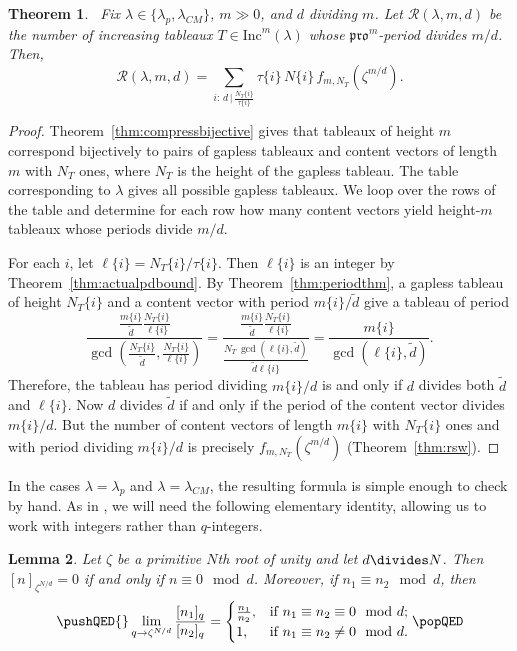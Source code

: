 \documentclass[12pt]{amsart}
\newtheorem{theorem}{Theorem}[section]
\newtheorem{lemma}[theorem]{Lemma}
\theoremstyle{definition}
\theoremstyle{remark}
\numberwithin{equation}{section}
\newcommand{\inc}{\ensuremath{\mathrm{Inc}}}
\newcommand{\pro}{\mathfrak{pro}}
\begin{document}
\begin{theorem}~\label{thm:mainresult}
Fix $\lambda \in \lbrace  \lambda_p, \lambda_{CM} \rbrace$, $m \gg 0$, and $d$ dividing $m$. Let $\mathcal{R}(\lambda,m,d)$ be the number of increasing tableaux $T \in \inc^m(\lambda)$ whose $\pro^m$-period divides $m/d$. Then,
\begin{equation}\label{eq:mainresulteq} 
\mathcal{R}(\lambda,m,d)  = \sum \limits_{i: \, d \, \vert \, \frac{N_T\{i\}}{\tau\{i\}}} \tau\{i\} \, N\{i\} \, f_{m,N_T}(\zeta^{m/d}).
\end{equation}
\end{theorem}
\begin{proof}
Theorem~\ref{thm:compressbijective} gives that tableaux of height $m$ correspond bijectively to pairs of gapless tableaux and content vectors of length $m$ with $N_T$ ones, where $N_T$ is the height of the gapless tableau. The table corresponding to $\lambda$ gives all possible gapless tableaux. We loop over the rows of the table and determine for each row how many content vectors yield height-$m$ tableaux whose periods divide $m/d$. 

For each $i$, let $\ell\{i\} = N_T\{i\}/\tau\{i\}$. Then $\ell\{i\}$ is an integer by Theorem~\ref{thm:actualpdbound}.  By Theorem~\ref{thm:periodthm}, a gapless tableau of height $N_T\{i\}$ and a content vector with period $m\{i\}/\tilde{d}$ give a tableau of period \[ \frac{\frac{m\{i\}}{\tilde{d}} \frac{N_T\{i\}}{\ell\{i\}}}{\gcd(\frac{N_T\{i\}}{\tilde{d}},\frac{N_T\{i\}}{\ell\{i\}})} = \frac{\frac{m\{i\}}{\tilde{d}} \frac{N_T\{i\}}{\ell\{i\}}}{\frac{N_T \, \gcd(\ell\{i\},\tilde{d})}{\tilde{d} \ell\{i\}}} = \frac{m\{i\}}{\gcd(\ell\{i\},\tilde{d})}. \] 
Therefore, the tableau has period dividing $m\{i\}/d$ is and only if $d$ divides both $\tilde{d}$ and $\ell\{i\}$. Now $d$ divides $\tilde{d}$ if and only if the period of the content vector divides $m\{i\}/d$. But the number of content vectors of length $m\{i\}$ with $N_T\{i\}$ ones and with period dividing $m\{i\}/d$ is precisely $f_{m,N_T}(\zeta^{m/d})$ (Theorem~\ref{thm:rsw}).
\end{proof}

In the cases $\lambda = \lambda_p$ and $\lambda = \lambda_{CM}$, the resulting formula is simple enough to check by hand. As in \cite[Proof of Theorem 7.1]{Reiner.Stanton.White}, we will need the following elementary identity, allowing us to work with integers rather than $q$-integers. 


\begin{lemma}\label{lem:evalq}
Let $\zeta$ be a primitive $N$th root of unity and let $d \divides N$. Then $[n]_{\zeta^{N/d}} = 0$ if and only if $n \equiv 0 \mod d$. Moreover, if $n_1 \equiv n_2 \mod d$, then 
\begin{equation}\label{eq:evalq}
\pushQED{\qed}
\lim \limits_{q \rightarrow \zeta^{N/d}} \frac{[n_1]_q}{[n_2]_q} = 
\begin{cases}
\frac{n_1}{n_2}, &\text{if }  n_1 \equiv n_2 \equiv 0 \mod d; \\
1, &\text{if } n_1 \equiv n_2 \neq 0 \mod d.
\end{cases} \qedhere \popQED
\end{equation}
\end{lemma}
\end{document}
